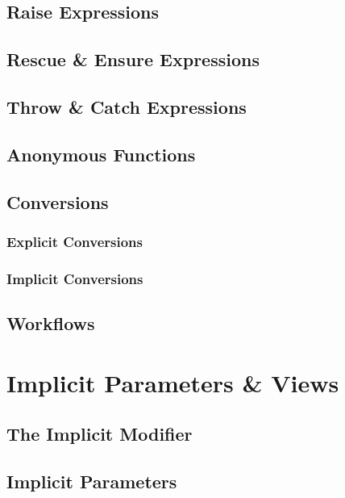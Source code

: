 \section{Raise Expressions}

\section{Rescue \& Ensure Expressions}

\section{Throw \& Catch Expressions}

\section{Anonymous Functions}

\section{Conversions}

\subsection{Explicit Conversions}

\subsection{Implicit Conversions}

\section{Workflows}
\label{sec:workflows}

\chapter{Implicit Parameters \& Views}

\section{The Implicit Modifier}

\section{Implicit Parameters}
\label{sec:implicit-parameters}

